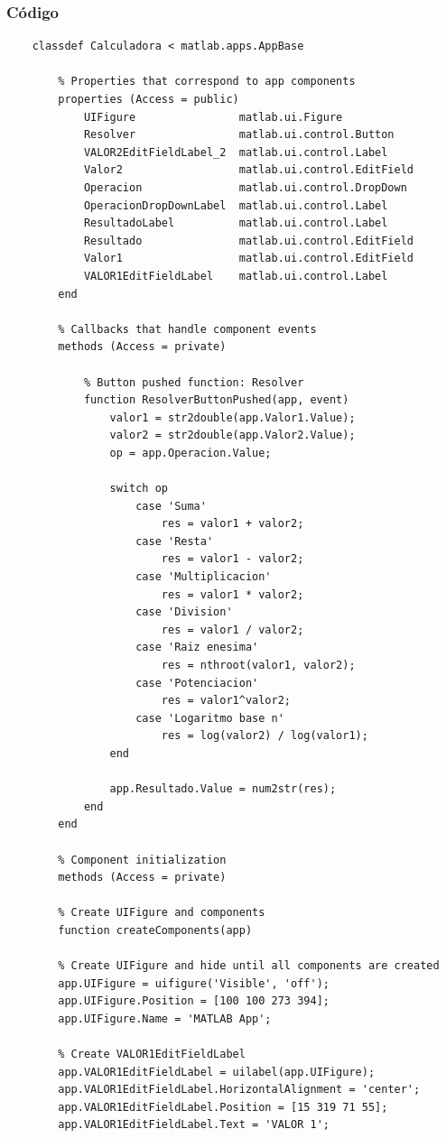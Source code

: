 \documentclass{article}
\begin{document}
	\newpage
	
	\subsubsection{Código}
	
	\begin{lstlisting}
	classdef Calculadora < matlab.apps.AppBase
	
		% Properties that correspond to app components
		properties (Access = public)
			UIFigure                matlab.ui.Figure
			Resolver                matlab.ui.control.Button
			VALOR2EditFieldLabel_2  matlab.ui.control.Label
			Valor2                  matlab.ui.control.EditField
			Operacion               matlab.ui.control.DropDown
			OperacionDropDownLabel  matlab.ui.control.Label
			ResultadoLabel          matlab.ui.control.Label
			Resultado               matlab.ui.control.EditField
			Valor1                  matlab.ui.control.EditField
			VALOR1EditFieldLabel    matlab.ui.control.Label
		end
		
		% Callbacks that handle component events
		methods (Access = private)
		
			% Button pushed function: Resolver
			function ResolverButtonPushed(app, event)
				valor1 = str2double(app.Valor1.Value);
				valor2 = str2double(app.Valor2.Value);
				op = app.Operacion.Value;
				
				switch op
					case 'Suma'
						res = valor1 + valor2;
					case 'Resta'
						res = valor1 - valor2;
					case 'Multiplicacion'
						res = valor1 * valor2;
					case 'Division'
						res = valor1 / valor2;
					case 'Raiz enesima'
						res = nthroot(valor1, valor2);
					case 'Potenciacion'
						res = valor1^valor2;
					case 'Logaritmo base n'
						res = log(valor2) / log(valor1);
				end
	
				app.Resultado.Value = num2str(res);
			end
		end
	
		% Component initialization
		methods (Access = private)
	
		% Create UIFigure and components
		function createComponents(app)
	
		% Create UIFigure and hide until all components are created
		app.UIFigure = uifigure('Visible', 'off');
		app.UIFigure.Position = [100 100 273 394];
		app.UIFigure.Name = 'MATLAB App';
	
		% Create VALOR1EditFieldLabel
		app.VALOR1EditFieldLabel = uilabel(app.UIFigure);
		app.VALOR1EditFieldLabel.HorizontalAlignment = 'center';
		app.VALOR1EditFieldLabel.Position = [15 319 71 55];
		app.VALOR1EditFieldLabel.Text = 'VALOR 1';
	

\end{lstlisting}
\end{document}
